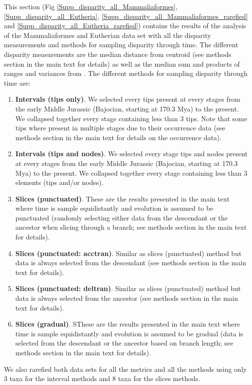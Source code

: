 \newpage
This section (Fig \ref{Supp_disparity_all_Mammaliaformes}, \ref{Supp_disparity_all_Eutheria}, \ref{Supp_disparity_all_Mammaliaformes_rarefied} and \ref{Supp_disparity_all_Eutheria_rarefied}) contains the results of the analysis of the Mammaliaformes and Eutherian data set with all the disparity measurements and methods for sampling disparity through time.
The different disparity measurements are the median distance from centroid (see methods section in the main text for details) as well as the median sum and products of ranges and variances from \cite{Wills1994}.
The different methods for sampling disparity through time are:
\begin{enumerate}
\item \textbf{Intervals (tips only)}. We selected every tips present at every stages from the early Middle Jurassic (Bajocian, starting at 170.3 Mya) to the present. We collapsed together every stage containing less than 3 tips. Note that some tips where present in multiple stages due to their occurrence data (see methods section in the main text for details on the occurrence data).
\item \textbf{Intervals (tips and nodes)}. We selected every stage tips and nodes present at every stages from the early Middle Jurassic (Bajocian, starting at 170.3 Mya) to the present. We collapsed together every stage containing less than 3 elements (tips and/or nodes).
\item \textbf{Slices (punctuated)}. These are the results presented in the main text where time is sample equidistantly and evolution is assumed to be punctuated (randomly selecting either data from the descendant or the ancestor when slicing through a branch; see methods section in the main text for details).
\item \textbf{Slices (punctuated: acctran)}. Similar as slices (punctuated) method but data is always selected from the descendant (see methods section in the main text for details).
\item \textbf{Slices (punctuated: deltran)}. Similar as slices (punctuated) method but data is always selected from the ancestor (see methods section in the main text for details).
\item \textbf{Slices (gradual)}. SThese are the results presented in the main text where time is sample equidistantly and evolution is assumed to be gradual (data is selected from the descendant or the ancestor based on branch length; see methods section in the main text for details).
\end{enumerate}
We also rarefied both data sets for all the metrics and all the methods using only 3 taxa for the interval methods and 8 taxa for the slices methods.

